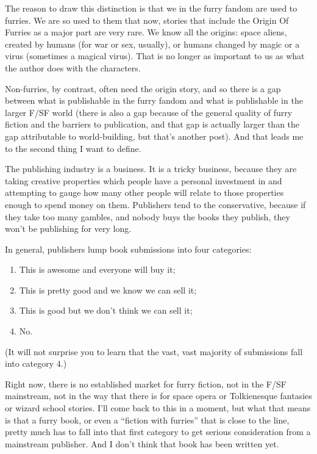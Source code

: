 The reason to draw this distinction is that we in the furry fandom are used to furries. We are so used to them that now, stories that include the Origin Of Furries as a major part are very rare. We know all the origins: space aliens, created by humans (for war or sex, usually), or humans changed by magic or a virus (sometimes a magical virus). That is no longer as important to us as what the author does with the characters.

Non-furries, by contrast, often need the origin story, and so there is a gap between what is publishable in the furry fandom and what is publishable in the larger F/SF world (there is also a gap because of the general quality of furry fiction and the barriers to publication, and that gap is actually larger than the gap attributable to world-building, but that's another post). And that leads me to the second thing I want to define.

The publishing industry is a business. It is a tricky business, because they are taking creative properties which people have a personal investment in and attempting to gauge how many other people will relate to those properties enough to spend money on them. Publishers tend to the conservative, because if they take too many gambles, and nobody buys the books they publish, they won't be publishing for very long.

In general, publishers lump book submissions into four categories:

\begin{enumerate}
  \item This is awesome and everyone will buy it;
  \item This is pretty good and we know we can sell it;
  \item This is good but we don't think we can sell it;
  \item No.
\end{enumerate}

(It will not surprise you to learn that the vast, vast majority of submissions fall into category 4.)

Right now, there is no established market for furry fiction, not in the F/SF mainstream, not in the way that there is for space opera or Tolkienesque fantasies or wizard school stories. I'll come back to this in a moment, but what that means is that a furry book, or even a ``fiction with furries'' that is close to the line, pretty much has to fall into that first category to get serious consideration from a mainstream publisher. And I don't think that book has been written yet.

